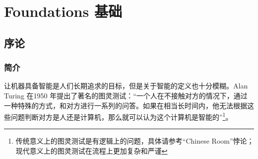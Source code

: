 \documentclass[11pt,fleqn, UTF8]{ctexbook} %
\begin{document}



\pagestyle{empty} %

\tableofcontents %

\cleardoublepage %

\pagestyle{fancy} %


\part{Foundations 基础}



\chapter{序论}

\section{简介}

让机器具备智能是人们长期追求的目标，但是关于智能的定义也十分模糊。Alan Turing 在1950 年提出了著名的图灵测试：“一个人在不接触对方的情况下，通过一种特殊的方式，和对方进行一系列的问答。如果在相当长时间内，他无法根据这些问题判断对方是人还是计算机，那么就可以认为这个计算机是智能的”\footnote{传统意义上的图灵测试是有逻辑上的问题，具体请参考“Chinese Room”悖论；现代意义上的图灵测试在流程上更加复杂和严谨}。\\
\end{document}
